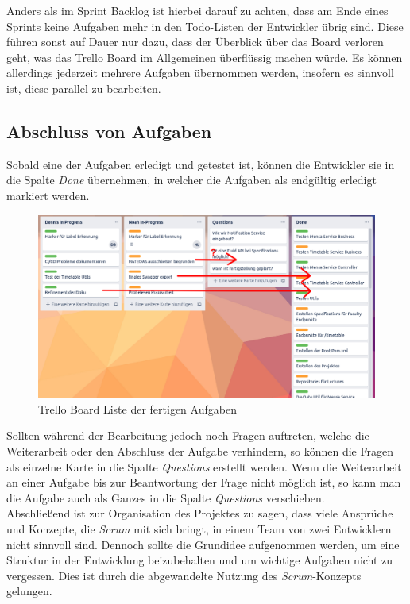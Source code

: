 Anders als im Sprint Backlog ist hierbei darauf zu achten, dass am Ende eines Sprints keine Aufgaben mehr in den Todo-Listen der Entwickler übrig sind. Diese führen sonst auf Dauer nur dazu, dass der Überblick über das Board verloren geht, was das Trello Board im Allgemeinen überflüssig machen würde. Es können allerdings jederzeit mehrere Aufgaben übernommen werden, insofern es sinnvoll ist, diese parallel zu bearbeiten.

\subsection*{Abschluss von Aufgaben}

Sobald eine der Aufgaben erledigt und getestet ist, können die Entwickler sie in die Spalte \textit{Done} übernehmen, in welcher die Aufgaben als endgültig erledigt markiert werden. 

\begin{figure}[H]
\centering
\includegraphics[width=14 cm]{Bilder/Kapitel_2/done.png}
\caption{Trello Board Liste der fertigen Aufgaben\label{fig:trello_done}}
\end{figure}

Sollten während der Bearbeitung jedoch noch Fragen auftreten, welche die Weiterarbeit oder den Abschluss der Aufgabe verhindern, so können die Fragen als einzelne Karte in die Spalte \textit{Questions} erstellt werden. Wenn die Weiterarbeit an einer Aufgabe bis zur Beantwortung der Frage nicht möglich ist, so kann man die Aufgabe auch als Ganzes in die Spalte \textit{Questions} verschieben.\\
\linebreak
Abschließend ist zur Organisation des Projektes zu sagen, dass viele Ansprüche und Konzepte, die \textit{Scrum} mit sich bringt, in einem Team von zwei Entwicklern nicht sinnvoll sind. Dennoch sollte die Grundidee aufgenommen werden, um eine Struktur in der Entwicklung beizubehalten und um wichtige Aufgaben nicht zu vergessen. Dies ist durch die abgewandelte Nutzung des \textit{Scrum}-Konzepts gelungen.